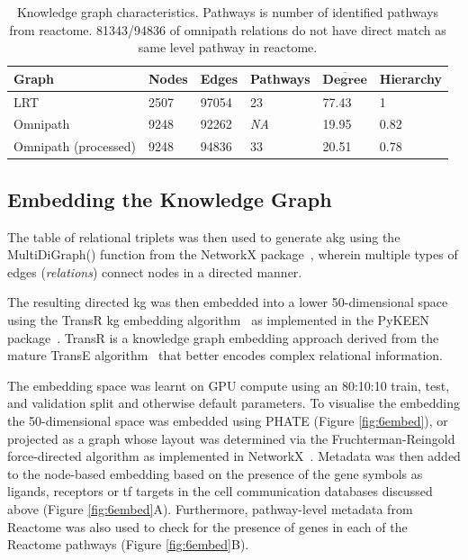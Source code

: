 \begingroup %
\renewcommand{\arraystretch}{1.2} %
    \begin{table}
    \centering
        \begin{tabular}{| p{1.8cm} p{1.8cm} p{1.8cm} p{1.8cm} p{1.8cm} p{1.8cm} |}
            \hline
            \textbf{Graph} & \textbf{Nodes} & \textbf{Edges} & \textbf{Pathways} & $\overline{\textbf{Degree}}$ & \textbf{Hierarchy} \\
            \hline\hline
            LRT & 2507 & 97054 & 23 & 77.43 & 1 \\
            \hline
            Omnipath & 9248 & 92262 & \textit{NA} & 19.95 & 0.82 \\
            \hline
            Omnipath (processed) & 9248 & 94836 & 33 & 20.51 & 0.78 \\
            \hline
        \end{tabular}
    \caption{Knowledge graph characteristics. Pathways is number of identified pathways from reactome. 81343/94836 of omnipath relations do not have direct match as same level pathway in reactome.}
    \label{tab:2kg}
    \end{table}
\endgroup

\subsection{Embedding the Knowledge Graph}

The table of relational triplets was then used to generate a\acrshort{kg} using the MultiDiGraph() function from the NetworkX package~\cite{hagberg_exploring_2008}, wherein multiple types of edges (\emph{relations}) connect nodes in a directed manner. 

The resulting directed \acrshort{kg} was then embedded into a lower 50-dimensional space using the TransR \acrshort{kg} embedding algorithm~\cite{zhang_transr_2021} as implemented in the PyKEEN package~\cite{ali_pykeen_2021}. TransR is a knowledge graph embedding approach derived from the mature TransE algorithm~\cite{bordes_translating_2013} that better encodes complex relational information. 

The embedding space was learnt on GPU compute using an 80:10:10 train, test, and validation split and otherwise default parameters.
To visualise the embedding the 50-dimensional space was embedded using PHATE (Figure \ref{fig:6embed}), or projected as a graph whose layout was determined via the Fruchterman-Reingold force-directed algorithm as implemented in NetworkX~\cite{fruchterman_graph_1991}.
Metadata was then added to the node-based embedding based on the presence of the gene symbols as ligands, receptors or \acrshort{tf} targets in the cell communication databases discussed above (Figure \ref{fig:6embed}A). Furthermore, pathway-level metadata from Reactome was also used to check for the presence of genes in each of the Reactome pathways (Figure \ref{fig:6embed}B).


